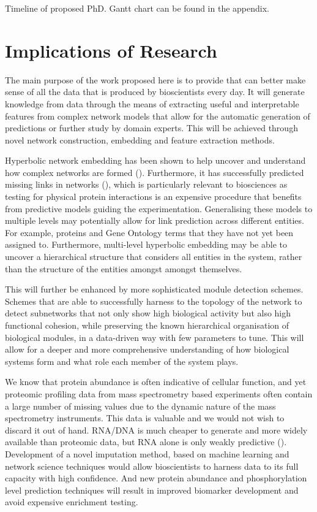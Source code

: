 \documentclass[
11pt, %
english, %
singlespacing, %
headsepline, %
]{MastersDoctoralThesis} %
\begin{document}
\begin{table}[htb]
	\centering
	\caption{Timeline of proposed PhD. Gantt chart can be found in the appendix.}
	\label{timeline}
\end{table}




\chapter{Implications of Research}

The main purpose of the work proposed here is to provide that can better make sense of all the data that is produced by bioscientists every day. It will generate knowledge from data through the means of extracting useful and interpretable features from complex network models that allow for the automatic generation of predictions or further study by domain experts. This will be achieved through novel network construction, embedding and feature extraction methods. 

Hyperbolic network embedding has been shown to help uncover and understand how complex networks are formed (\cite{krioukov2010hyperbolic}). Furthermore, it has successfully predicted missing links in networks (\cite{alanis2016efficient}), which is particularly relevant to biosciences as testing for physical protein interactions is an expensive procedure that benefits from predictive models guiding the experimentation. Generalising these models to multiple levels may potentially allow for link prediction across different entities. For example, proteins and Gene Ontology terms that they have not yet been assigned to. Furthermore, multi-level hyperbolic embedding may be able to uncover a hierarchical structure that considers all entities in the system, rather than the structure of the entities amongst amongst themselves.

This will further be enhanced by more sophisticated module detection schemes. Schemes that are able to successfully harness to the topology of the network to detect subnetworks that not only show high biological activity but also high functional cohesion, while preserving the known hierarchical organisation of biological modules, in a data-driven way with few parameters to tune. This will allow for a deeper and more comprehensive understanding of how biological systems form and what role each member of the system plays. 

We know that protein abundance is often indicative of cellular function, and yet proteomic profiling data from mass spectrometry based experiments often contain a large number of missing values due to the dynamic nature of the mass spectrometry instruments. This data is valuable and we would not wish to discard it out of hand. RNA/DNA is much cheaper to generate and more widely available than proteomic data, but RNA alone is only weakly predictive (\cite{vogel2012insights}). Development of a novel imputation method, based on machine learning and network science techniques would allow bioscientists to harness data to its full capacity with high confidence. And new protein abundance and phosphorylation level prediction techniques will result in improved biomarker development and avoid expensive enrichment testing. 
\end{document}
